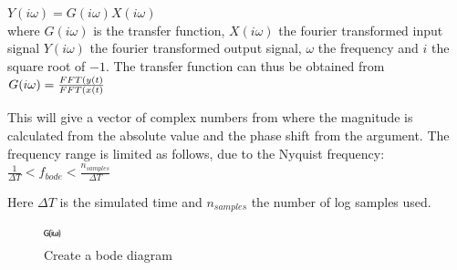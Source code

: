 $Y(i\omega)=G(i\omega)X(i\omega)$ \\

where $G(i\omega)$ is the transfer function, $X(i\omega)$ the fourier transformed input signal  $Y(i\omega)$ the fourier transformed output signal, $\omega$ the frequency and $i$ the square root of $-1$. The transfer function can thus be obtained from\\

$G(i\omega)=\frac{FFT(y(t)}{FFT(x(t)}\\$

This will give a vector of complex numbers from where the magnitude is calculated from the absolute value and the phase shift from the argument. The frequency range is limited as follows, due to the Nyquist frequency: \\

$\frac{1}{\Delta T}<f_{bode}<\frac{n_{samples}}{\Delta T}$

Here $\Delta T$ is the simulated time and $n_{samples}$ the number of log samples used.


\begin{figure}
  \includegraphics[width=5mm]
    {../../HopsanGUI/graphics/uiicons/Hopsan-TransferFunctionAnalysis.png}%
  \caption*{Create a bode diagram}
\end{figure}



